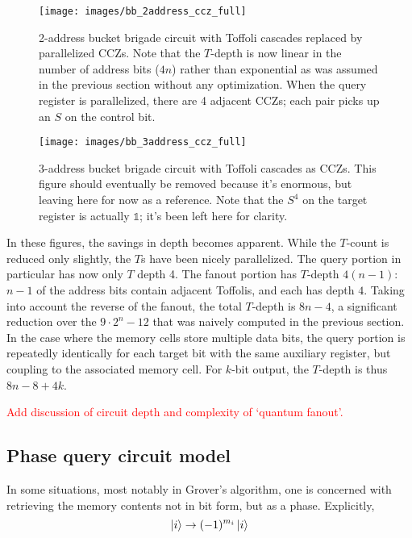 \documentclass[a4paper,12pt]{article}
\newcommand\todo[1]{\textcolor{red}{#1}}
\begin{document}
\begin{sidewaysfigure}[ht]
 \captionsetup{width=.89\linewidth}
 \texttt{[image: images/bb\_2address\_ccz\_full]}
 \caption{2-address bucket brigade circuit with Toffoli cascades replaced by parallelized CCZs. 
 Note that the $T$-depth is now linear in the number of address bits ($4n$) rather than exponential as was assumed in the previous section without any optimization.
 When the query register is parallelized, there are 4 adjacent CCZs; each pair picks up an $S$ on the control bit.}
 \label{fig:bb_2address_ccz_full}
\end{sidewaysfigure}

\begin{sidewaysfigure}[ht]
 \captionsetup{width=.89\linewidth}
 \texttt{[image: images/bb\_3address\_ccz\_full]}
 \caption{3-address bucket brigade circuit with Toffoli cascades as CCZs. 
 This figure should eventually be removed because it's enormous, but leaving here for now as a reference.
 Note that the $S^4$ on the target register is actually $\mathds{1}$; it's been left here for clarity.}
 \label{fig:bb_3address_ccz_full}
\end{sidewaysfigure}

In these figures, the savings in depth becomes apparent.
While the $T$-count is reduced only slightly, the $T$s have been nicely parallelized.
The query portion in particular has now only $T$ depth 4.
The fanout portion has $T$-depth $4(n-1)$: $n - 1$ of the address bits contain adjacent Toffolis, and each has depth $4$.
Taking into account the reverse of the fanout, the total $T$-depth is $8n - 4$, a significant reduction over the $9 \cdot 2^n - 12$ that was naively computed in the previous section.
In the case where the memory cells store multiple data bits, the query portion is repeatedly identically for each target bit with the same auxiliary register, but coupling to the associated memory cell. 
For $k$-bit output, the $T$-depth is thus $8n - 8 + 4k$.

\todo{Add discussion of circuit depth and complexity of `quantum fanout'.}

\subsection{Phase query circuit model}

In some situations, most notably in Grover's algorithm, one is concerned with retrieving the memory contents not in bit form, but as a phase. 
Explicitly, 
\begin{equation}
 \ket{i} \rightarrow (-1)^{m_i} \ket{i}
\end{equation}
\end{document}
